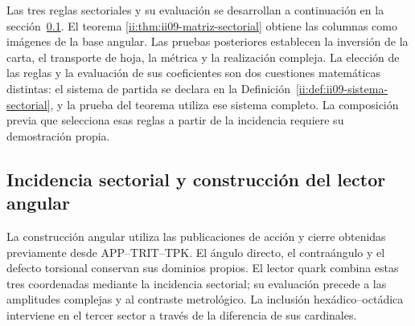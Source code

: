\begin{remark}
Las tres reglas sectoriales y su evaluación se desarrollan a continuación
en la sección~\ref{ii:sec:ii09-construccion-sectorial}. El teorema
\ref{ii:thm:ii09-matriz-sectorial} obtiene las columnas como imágenes de la
base angular. Las pruebas posteriores establecen la inversión de la carta,
el transporte de hoja, la métrica y la realización compleja.
La elección de las reglas y la evaluación de sus coeficientes son dos
cuestiones matemáticas distintas: el sistema de partida se declara en la
Definición~\ref{ii:def:ii09-sistema-sectorial}, y la prueba del teorema
utiliza ese sistema completo. La composición previa que selecciona esas
reglas a partir de la incidencia requiere su demostración propia.
\end{remark}



\subsection{Incidencia sectorial y construcción del lector angular}
\label{ii:sec:ii09-construccion-sectorial}

La construcción angular utiliza las publicaciones de acción y cierre
obtenidas previamente desde APP--TRIT--TPK. El ángulo directo, el
contraángulo y el defecto torsional conservan sus dominios propios.
El lector quark combina estas tres coordenadas mediante la incidencia
sectorial; su evaluación precede a las amplitudes complejas y al
contraste metrológico. La inclusión hexádico--octádica interviene en
el tercer sector a través de la diferencia de sus cardinales.


